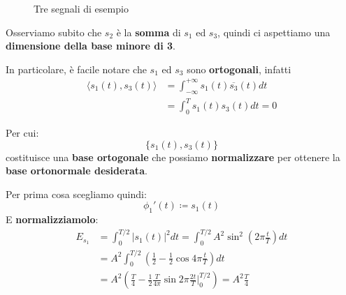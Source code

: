 \begin{figure}[!ht]
    \caption{Tre segnali di esempio}
    \label{fig:06_01_SegnaliEsempioOrtonormalizzazione}
\end{figure}

\begin{remark}
    Osserviamo subito che $s_{2}$ è la \textbf{somma} di $s_{1}$ ed $s_{3}$, quindi
    ci aspettiamo una \textbf{dimensione della base minore di 3}.
\end{remark}

In particolare, è facile notare che $s_{1}$ ed $s_{3}$ sono
\textbf{ortogonali}, infatti
\[
    \begin{aligned}
        \langle s_{1}(t), s_{3}(t) \rangle &= \int_{-\infty}^{+\infty} s_{1}(t) \overline{s_{3}}(t) dt \\ 
                                           &= \int_{0}^{T} s_{1}(t) s_{3}(t) dt = 0
    \end{aligned}
\]

Per cui:
\[
    \{s_{1}(t), s_{3}(t)\}  
\] 
costituisce una \textbf{base ortogonale} che possiamo \textbf{normalizzare}
per ottenere la \textbf{base ortonormale desiderata}.

Per prima cosa scegliamo quindi:
\[
    \phi_{1}'(t) \coloneqq s_{1}(t)
\]
E \textbf{normalizziamolo}:
\[
    \begin{aligned}
        E_{s_{1}} &= \int_0^{T/2} |s_{1}(t)|^2 dt = 
        \int_{0}^{T/2} A^2 \sin^2 \left( 2\pi \frac{t}{T} \right) dt \\ 
                  &= A^2 \int_{0}^{T/2} \left( \frac{1}{2} - \frac{1}{2}\cos 4\pi\frac{t}{T} \right)dt \\ 
                  &= A^2 \left( \frac{T}{4} - 
                  \frac{1}{2} \frac{T}{4\pi} \sin 2\pi \frac{2t}{T} \bigg|_0^{T/2} \right) = A^2 \frac{T}{4}
    \end{aligned}
\]


